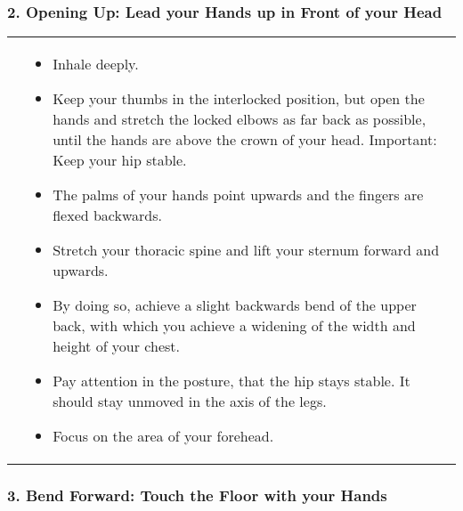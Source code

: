 \documentclass[../Book.Stress_regulation.tex]{subfiles}
\begin{document}
\subsubsection{2. Opening Up: Lead your Hands up in Front of your Head}

\begin{tabular}{p{1.3cm} p{10.2cm}}
     \raisebox{-1.05\totalheight}{\texttt{[image: SS\_Opening]}}
& 
\begin{itemize}
\item Inhale deeply.
\item Keep your thumbs in the interlocked position, but open the hands and stretch the locked elbows as far back as possible, until the hands are above the crown of your head. Important: Keep your hip stable.
\item The palms of your hands point upwards and the fingers are flexed backwards.
\item Stretch your thoracic spine and lift your sternum forward and upwards.
\item By doing so, achieve a slight backwards bend of the upper back, with which you achieve a widening of the width and height of your chest.
\item Pay attention in the posture, that the hip stays stable. It should stay unmoved in the axis of the legs.
\item Focus on the area of your forehead.
\end{itemize}  
\end{tabular}


\subsubsection{3. Bend Forward: Touch the Floor with your Hands}
\end{document}
